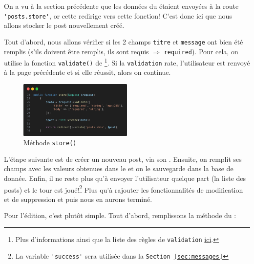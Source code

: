 \newpage

\label{sec:posts_store}

On a vu à la section précédente que les données du \form{} étaient envoyées à la route \verb|'posts.store'|, or cette \route{} redirige vers cette fonction! C'est donc ici que nous allons stocker le post nouvellement créé.

Tout d'abord, nous allons vérifier si les 2 champs \verb|titre| et \verb|message| ont bien été remplis (s'ils doivent être remplis, ils sont requis $\Rightarrow$ \verb|required|). Pour cela, on utilise la fonction \verb|validate()| de \laravel\footnote{Plus d'informations ainsi que la liste des règles de \texttt{validation} \href{https://laravel.com/docs/12.x/validation#quick-writing-the-validation-logic}{ici}.}. Si la \texttt{validation} rate, l'utilisateur est renvoyé à la page précédente et si elle réussit, alors on continue.

\begin{figure}
    \vspace{-0.5cm}
    \includegraphics[width=0.5\textwidth]{figures-C1/postscontroller_store.png}
    \caption{Méthode \texttt{store()}}
\end{figure}
L'étape suivante est de créer un nouveau post, via son \model{}. Ensuite, on remplit ses champs avec les valeurs obtenues dans le \form{} et on le sauvegarde dans la base de donnée. Enfin, il ne reste plus qu'à envoyer l'utilisateur quelque part (la liste des posts) et le tour est joué!\footnote{La variable \verb|'success'| sera utilisée dans la \texttt{Section~\ref{sec:messages}}} Plus qu'à rajouter les fonctionnalités de modification et de suppression et puis nous en aurons terminé.

\vspace{1.5cm}

Pour l'édition, c'est plutôt simple. Tout d'abord, remplissons la méthode du \controller{}:
\vspace{1cm}

